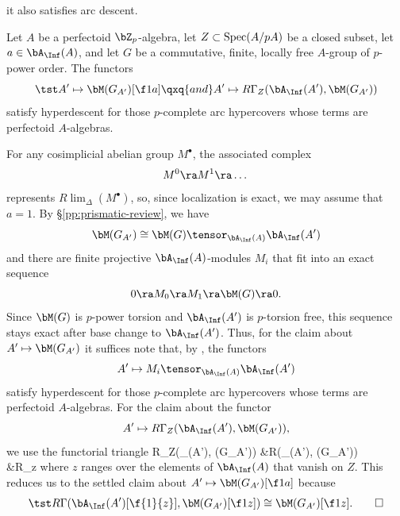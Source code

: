 it also satisfies arc descent.
\epf



\bprop \label{M(G)-coho-descent}
Let $A$ be a perfectoid $\bZ_p$-algebra,  let   $Z \subset \operatorname{Spec}(A/pA)$ be a closed subset, let $a \in \bA_\Inf(A)$, and %
let $G$ be a commutative, finite, locally free $A$-group of $p$-power order. %
 The functors
\[
\tst A' \mapsto \bM(G_{A'})[\f 1a] \qxq{and} A' \mapsto R\Gamma_Z(\bA_\Inf(A'), \bM(G_{A'})) %
\]
satisfy hyperdescent for those $p$-complete arc hypercovers whose terms are perfectoid $A$-algebras.
\eprop

\bpf
For any cosimplicial abelian group $M^\bullet$, the associated complex
\[
M^0 \ra M^1 \ra \dotsc
\]
represents $R\lim_\Delta(M^\bullet)$, %
so, since localization is exact, we may assume that $a = 1$. %
By  \S\ref{pp:prismatic-review}, we have
\[
\bM(G_{A'}) \cong \bM(G) \tensor_{\bA_\Inf(A)} \bA_\Inf(A')
\]
and there are finite projective $\bA_\Inf(A)$-modules $M_i$ that fit into an exact sequence
\[
0 \ra M_0 \ra M_1 \ra \bM(G) \ra 0.
\]
Since $\bM(G)$ is $p$-power torsion and $\bA_\Inf(A')$ is $p$-torsion free, this sequence stays exact after base change to $\bA_\Inf(A')$. Thus, for the claim about $A' \mapsto \bM(G_{A'})$ it suffices %
note that, by , the functors
\[
A' \mapsto M_i \tensor_{\bA_\Inf(A)} \bA_\Inf(A')
\]
satisfy hyperdescent for those $p$-complete arc hypercovers whose terms are perfectoid $A$-algebras. For the claim about the functor
\[
A' \mapsto R\Gamma_Z(\bA_\Inf(A'), \bM(G_{A'})),
\]
we use the functorial triangle
\be
\ba
\tst R\Gamma_Z(\bA_\Inf(A'), \bM(G_{A'})) \ra &R\Gamma(\bA_\Inf(A'), \bM(G_{A'})) \\ &\tst\ra R\varprojlim_z 
\ea
\ee
where $z$ ranges over the elements of $\bA_\Inf(A)$ that vanish on $Z$. This reduces us to the settled claim about $A' \mapsto \bM(G_{A'})[\f 1a]$ because
\[
\tst R\Gamma(\bA_\Inf(A')[\f{1}{z}], \bM(G_{A'})[\f 1z]) \cong \bM(G_{A'})[\f 1z]. \qedhere
\]
\epf






